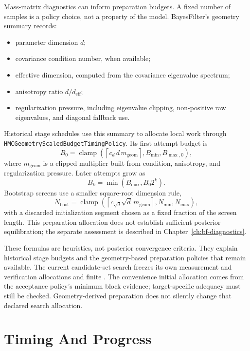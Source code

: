 Mass-matrix diagnostics can inform preparation budgets. A fixed number of
samples is a policy choice, not a property of the model. BayesFilter's geometry
summary records:

\begin{itemize}
  \item parameter dimension \(d\);
  \item covariance condition number, when available;
  \item effective dimension, computed from the covariance eigenvalue spectrum;
  \item anisotropy ratio \(d/d_{\mathrm{eff}}\);
  \item regularization pressure, including eigenvalue clipping, non-positive
    raw eigenvalues, and diagonal fallback use.
\end{itemize}

Historical stage schedules use this summary to allocate local work through
\texttt{HMCGeometryScaledBudgetTimingPolicy}. Its first attempt budget is
\[
  B_0 =
  \operatorname{clamp}\left(
    \left\lceil c_d\, d\, m_{\mathrm{geom}}\right\rceil,
    B_{\min}, B_{\max,0}
  \right),
\]
where \(m_{\mathrm{geom}}\) is a clipped multiplier built from condition,
anisotropy, and regularization pressure.  Later attempts grow as
\[
  B_k = \min(B_{\max}, B_0 2^k).
\]
Bootstrap screens use a smaller square-root dimension rule,
\[
  N_{\mathrm{boot}} =
  \operatorname{clamp}\left(
    \left\lceil c_{\sqrt d}\sqrt d\,m_{\mathrm{geom}}\right\rceil,
    N_{\min}, N_{\max}
  \right),
\]
with a discarded initialization segment chosen as a fixed fraction of the screen
length. This preparation allocation does not establish sufficient posterior
equilibration; the separate assessment is described in Chapter~\ref{ch:bf-diagnostics}.

These formulas are heuristics, not posterior convergence criteria. They explain
historical stage budgets and the geometry-based preparation policies that remain
available. The current candidate-set search freezes its own measurement and
verification allocations and finite . The convenience
initial allocation comes from the acceptance policy's minimum block evidence;
target-specific adequacy must still be checked. Geometry-derived preparation
does not silently change that declared search allocation.

\section{Timing And Progress}
\label{sec:bf-hmc-timing-and-progress}

